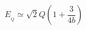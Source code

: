 \begin{equation}
E_{_{Q}}\simeq \sqrt{2}Q \left(1+{\frac{3}{4 b}}\right)  \label{EQB}
\end{equation}

